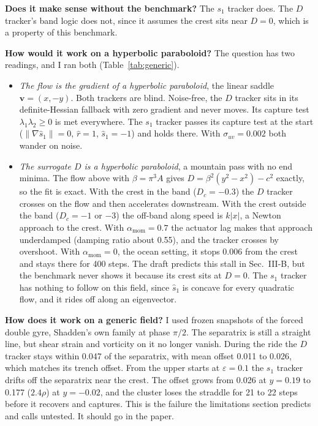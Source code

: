 \documentclass[10.5pt]{article}
\newcommand{\shat}{\hat{s}_1}
\begin{document}
\textbf{Does it make sense without the benchmark?} The $s_1$ tracker does. The $D$ tracker's band logic does not, since it assumes the crest sits near $D=0$, which is a property of this benchmark.

\textbf{How would it work on a hyperbolic paraboloid?} The question has two readings, and I ran both (Table~\ref{tab:generic}).
\begin{itemize}[leftmargin=1.2em]
\item \emph{The flow is the gradient of a hyperbolic paraboloid}, the linear saddle $\mathbf v=(x,-y)$. Both trackers are blind. Noise-free, the $D$ tracker sits in its definite-Hessian fallback with zero gradient and never moves. Its capture test $\lambda_1\lambda_2\ge0$ is met everywhere. The $s_1$ tracker passes its capture test at the start ($\|\nabla\shat\|=0$, $\hat r=1$, $\shat=-1$) and holds there. With $\sigma_{uv}=0.002$ both wander on noise.
\item \emph{The surrogate $D$ is a hyperbolic paraboloid}, a mountain pass with no end minima. The flow above with $\beta=\pi^3A$ gives $D=\beta^2(y^2-x^2)-c^2$ exactly, so the fit is exact. With the crest in the band ($D_c=-0.3$) the $D$ tracker crosses on the flow and then accelerates downstream. With the crest outside the band ($D_c=-1$ or $-3$) the off-band along speed is $k|x|$, a Newton approach to the crest. With $\alpha_{\mathrm{mom}}=0.7$ the actuator lag makes that approach underdamped (damping ratio about 0.55), and the tracker crosses by overshoot. With $\alpha_{\mathrm{mom}}=0$, the ocean setting, it stops 0.006 from the crest and stays there for 400 steps. The draft predicts this stall in Sec.~III-B, but the benchmark never shows it because its crest sits at $D=0$. The $s_1$ tracker has nothing to follow on this field, since $\shat$ is concave for every quadratic flow, and it rides off along an eigenvector.
\end{itemize}

\textbf{How does it work on a generic field?} I used frozen snapshots of the forced double gyre, Shadden's own family at phase $\pi/2$. The separatrix is still a straight line, but shear strain and vorticity on it no longer vanish. During the ride the $D$ tracker stays within 0.047 of the separatrix, with mean offset 0.011 to 0.026, which matches its trench offset. From the upper starts at $\varepsilon=0.1$ the $s_1$ tracker drifts off the separatrix near the crest. The offset grows from 0.026 at $y=0.19$ to 0.177 ($2.4\rho$) at $y=-0.02$, and the cluster loses the straddle for 21 to 22 steps before it recovers and captures. This is the failure the limitations section predicts and calls untested. It should go in the paper.
\end{document}
